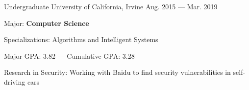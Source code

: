 \vspace{-2.5mm}
\begin{entries}
  \vspace{-1.0mm}
  \entry%
    {Undergraduate}%
    {University of California, Irvine}%
    {}%
    {Aug. 2015 --- Mar. 2019}%
    {
      \begin{entryitems}
        \item Major: \textbf{Computer Science}
        \vspace{2.0mm}
        \begin{entryitems}
          \item Specializations: Algorithms and Intelligent Systems
        \end{entryitems}
        \vspace{2.0mm}
        \item Major GPA: 3.82 --- Cumulative GPA: 3.28%
        \item Research in Security: Working with Baidu to find security vulnerabilities in self-driving cars%
      \end{entryitems}
    }%
\end{entries}